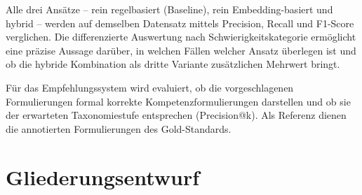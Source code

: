 \documentclass[12pt,a4paper]{article}
\begin{document}
Alle drei Ans\"atze -- rein regelbasiert (Baseline), rein Embedding-basiert und hybrid -- werden auf demselben Datensatz mittels Precision, Recall und F1-Score verglichen. Die differenzierte Auswertung nach Schwierigkeitskategorie erm\"oglicht eine pr\"azise Aussage dar\"uber, in welchen F\"allen welcher Ansatz \"uberlegen ist und ob die hybride Kombination als dritte Variante zus\"atzlichen Mehrwert bringt.

F\"ur das Empfehlungssystem wird evaluiert, ob die vorgeschlagenen Formulierungen formal korrekte Kompetenzformulierungen darstellen und ob sie der erwarteten Taxonomiestufe entsprechen (Precision@k). Als Referenz dienen die annotierten Formulierungen des Gold-Standards.

\section{Gliederungsentwurf}

\renewcommand{\labelenumi}{\textbf{\arabic{enumi}}}
\renewcommand{\labelenumii}{\arabic{enumi}.\arabic{enumii}}
\end{document}
